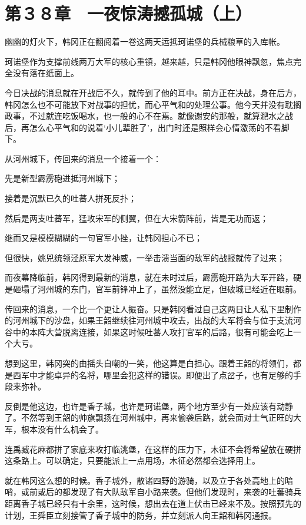 \section{第３８章　一夜惊涛撼孤城（上）}

幽幽的灯火下，韩冈正在翻阅着一卷这两天运抵珂诺堡的兵械粮草的入库帐。

珂诺堡作为支撑前线两万大军的核心重镇，越来越，只是韩冈他眼神飘忽，焦点完全没有落在纸面上。

今日决战的消息就在开战后不久，就传到了他的耳中。前方正在决战，身在后方，韩冈怎么也不可能放下对战事的担忧，而心平气和的处理公事。他今天并没有耽搁政事，不过就连吃饭喝水，也一般的心不在焉。就像谢安的那般，就算淝水之战后，再怎么心平气和的说着‘小儿辈胜了’，出门时还是照样会心情激荡的不看脚下。

从河州城下，传回来的消息一个接着一个：

先是新型霹雳砲进抵河州城下；

接着是沉默已久的吐蕃人拼死反扑；

然后是两支吐蕃军，猛攻宋军的侧翼，但在大宋箭阵前，皆是无功而返；

继而又是模模糊糊的一句官军小挫，让韩冈担心不已；

但很快，姚兕统领泾原军大发神威，一举击溃当面的敌军的战报就传了过来；

而夜幕降临前，韩冈得到最新的消息，就在未时过后，霹雳砲开路为大军开路，硬是砸塌了河州城的东门，官军前锋冲上了，虽然没能立足，但破城已经近在眼前。

传回来的消息，一个比一个更让人振奋。只是韩冈看过自己这两日让人私下里制作的河州城下的沙盘，如果王韶继续往河州城中攻去，出战的大军将会与位于支流河谷中的本阵大营脱离连接，如果这时候吐蕃人攻打官军的后路，很有可能会吃上一个大亏。

想到这里，韩冈突的由摇头自嘲的一笑，他这算是白担心。跟着王韶的将领们，都是西军中才能卓异的名将，哪里会犯这样的错误。即便出了点岔子，也有足够的手段来弥补。

反倒是他这边，也许是香子城，也许是珂诺堡，两个地方至少有一处应该有动静了。不然等到王韶的帅旗飘扬在河州城中，再来偷袭后路，就会面对士气正旺的大军，根本没有什么机会了。

连禹臧花麻都拼了家底来攻打临洮堡，在这样的压力下，木征不会将希望放在硬拼这条路上。可以确定，只要能派上一点用场，木征必然都会选择用上。

就在韩冈这么想的时候。香子城外，散诸四野的游骑，以及立于各处高地上的暗哨，或前或后的都发现了有大队敌军自小路来袭。但他们发现时，来袭的吐蕃骑兵距离香子城已经只有十余里，这时候，想出去在道上伏击已经来不及。按照预先的计划，王舜臣立刻接管了香子城中的防务，并立刻派人向王韶和韩冈通报。

